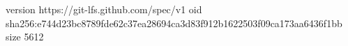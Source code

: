 version https://git-lfs.github.com/spec/v1
oid sha256:e744d23bc8789fde62c37ea28694ca3d83f912b1622503f09ca173aa6436f1bb
size 5612
